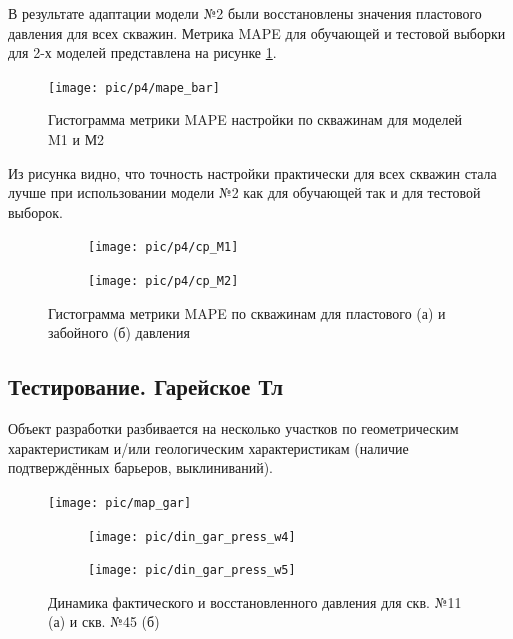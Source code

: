 \documentclass[14pt]{article}
\begin{document}
В результате адаптации модели №2 были восстановлены значения пластового давления для всех скважин. Метрика MAPE для обучающей и тестовой выборки для 2-х моделей представлена на рисунке \ref{fig:bar_mape_s1s2}.
\begin{figure}
	\centering
	\texttt{[image: pic/p4/mape\_bar]}
	\caption{Гистограмма метрики MAPE настройки по скважинам для моделей M1 и М2}
	\label{fig:bar_mape_s1s2}
\end{figure}
Из рисунка видно, что точность настройки практически для всех скважин стала лучше при использовании модели №2 как для обучающей так и для тестовой выборок.

\begin{figure}[!htb]
	\begin{subfigure}[b]{0.45\linewidth}
		\texttt{[image: pic/p4/cp\_M1]}
		\caption{}
		\label{fig:well9_cp_m1}
	\end{subfigure}
	\begin{subfigure}[b]{0.45\linewidth}
		\texttt{[image: pic/p4/cp\_M2]}
		\caption{}
		\label{fig:well9_cp_m2}
	\end{subfigure}
	\label{fig:well9_cp}
	\caption{Гистограмма метрики MAPE по скважинам для пластового (а) и забойного (б) давления}
\end{figure}

\subsection{Тестирование. Гарейское Тл}
Объект разработки разбивается на несколько участков по геометрическим характеристикам и/или геологическим характеристикам (наличие подтверждённых барьеров, выклиниваний).
\begin{figure}
	\centering
	\texttt{[image: pic/map\_gar]}
	\caption{}
	\label{fig:mapgar}
\end{figure}

 \begin{figure}[!htb]
	\centering
	\begin{subfigure}[b]{0.9\linewidth}
		\texttt{[image: pic/din\_gar\_press\_w4]}
		\caption{}
		\label{fig:din_gar_press_11}
	\end{subfigure}
	\begin{subfigure}[b]{0.9\linewidth}
		\texttt{[image: pic/din\_gar\_press\_w5]}
		\caption{}
		\label{fig:din_gar_press_45}
	\end{subfigure}
	\caption{Динамика фактического и восстановленного давления для скв. №11 (а) и скв. №45 (б)}
\end{figure}
\end{document}
